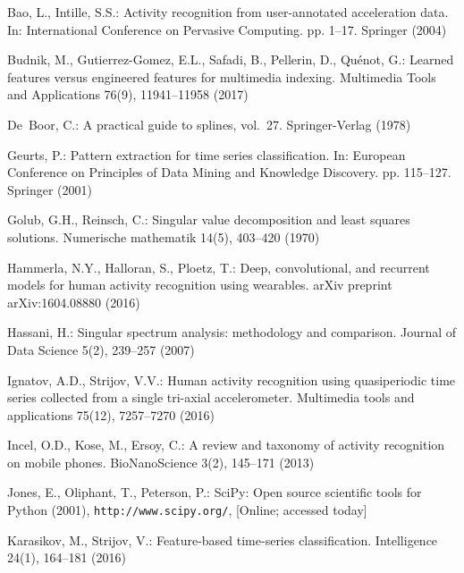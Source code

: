 \documentclass{llncs}
\begin{document}
\begin{thebibliography}{10}
	\providecommand{\url}[1]{\texttt{#1}}
	\providecommand{\urlprefix}{URL }
	
	Bao, L., Intille, S.S.: Activity recognition from user-annotated acceleration
	data. In: International Conference on Pervasive Computing. pp. 1--17.
	Springer (2004)
	
	Budnik, M., Gutierrez-Gomez, E.L., Safadi, B., Pellerin, D., Qu{\'e}not, G.:
	Learned features versus engineered features for multimedia indexing.
	Multimedia Tools and Applications  76(9),  11941--11958 (2017)
	
	De~Boor, C.: A practical guide to splines, vol.~27. Springer-Verlag (1978)
	
	Geurts, P.: Pattern extraction for time series classification. In: European
	Conference on Principles of Data Mining and Knowledge Discovery. pp.
	115--127. Springer (2001)
	
	Golub, G.H., Reinsch, C.: Singular value decomposition and least squares
	solutions. Numerische mathematik  14(5),  403--420 (1970)
	
	Hammerla, N.Y., Halloran, S., Ploetz, T.: Deep, convolutional, and recurrent
	models for human activity recognition using wearables. arXiv preprint
	arXiv:1604.08880  (2016)
	
	Hassani, H.: Singular spectrum analysis: methodology and comparison. Journal of
	Data Science  5(2),  239--257 (2007)
	
	Ignatov, A.D., Strijov, V.V.: Human activity recognition using quasiperiodic
	time series collected from a single tri-axial accelerometer. Multimedia tools
	and applications  75(12),  7257--7270 (2016)
	
	Incel, O.D., Kose, M., Ersoy, C.: A review and taxonomy of activity recognition
	on mobile phones. BioNanoScience  3(2),  145--171 (2013)
	
	Jones, E., Oliphant, T., Peterson, P.: {SciPy}: Open source scientific tools
	for {Python} (2001), \url{http://www.scipy.org/}, [Online; accessed today]
	
	Karasikov, M., Strijov, V.: Feature-based time-series classification.
	Intelligence  24(1),  164--181 (2016)
	

\end{thebibliography}
\end{document}
